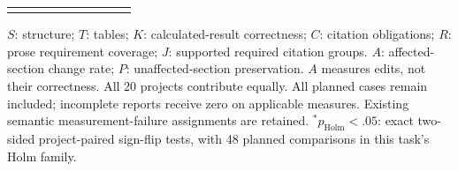 \begin{table}[t]
\begin{tabular}{llrrrrrrrr}
\addlinespace[2pt]
\bottomrule
\end{tabular}
\par\vspace{3pt}
\begin{minipage}{0.98\linewidth}\footnotesize
$S$: structure; $T$: tables; $K$: calculated-result correctness; $C$: citation obligations; $R$: prose requirement coverage; $J$: supported required citation groups. $A$: affected-section change rate; $P$: unaffected-section preservation. $A$ measures edits, not their correctness. All 20 projects contribute equally. All planned cases remain included; incomplete reports receive zero on applicable measures. Existing semantic measurement-failure assignments are retained. $^{*}p_{\mathrm{Holm}}<.05$: exact two-sided project-paired sign-flip tests, with 48 planned comparisons in this task's Holm family.
\end{minipage}
\end{table}
